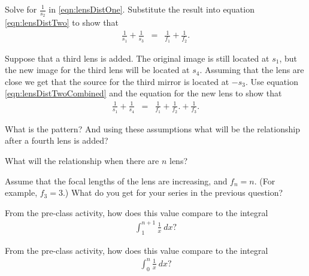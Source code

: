 \begin{problem}
  \item Solve for $\frac{1}{s_2}$ in \ref{eqn:lensDistOne}. Substitute the result into equation \ref{eqn:lensDistTwo} to show that
  \begin{eqnarray}
    \label{eqn:lensDistTwoCombined}
    \frac{1}{s_1} + \frac{1}{s_3} & = & \frac{1}{f_1} + \frac{1}{f_2}.
  \end{eqnarray}

  \vfill
  \vfill

  \item Suppose that a third lens is added. The original image is still located at $s_1$, but the new image for the third lens will be located at $s_4$.
  Assuming that the lens are close we get that the source for the third mirror is located at $-s_3$. Use equation \ref{eqn:lensDistTwoCombined} and the equation for the new lens to show that
  \begin{eqnarray*}
    \frac{1}{s_1} + \frac{1}{s_4} & = & \frac{1}{f_1} + \frac{1}{f_2}. + \frac{1}{f_3}.
  \end{eqnarray*}

    \vfill
    \vfill

  \item What is the pattern? And using these assumptions what will be the relationship after a fourth lens is added?

  \vfill

  \item What will the relationship when there are $n$ lens?

  \vfill

\clearpage

\item Assume that the focal lengths of the lens are increasing, and $f_n=n$. (For example, $f_3=3$.)
What do you get for your series in the previous question?
  \vfill

\item From the pre-class activity, how does this value compare to the integral
\begin{eqnarray*}
  \int^{n+1}_1 \frac{1}{x} ~ dx?
\end{eqnarray*}
\vfill

\item From the pre-class activity, how does this value compare to the integral
\begin{eqnarray*}
  \int^{n}_0 \frac{1}{x} ~ dx?
\end{eqnarray*}
\vfill


\end{problem}
